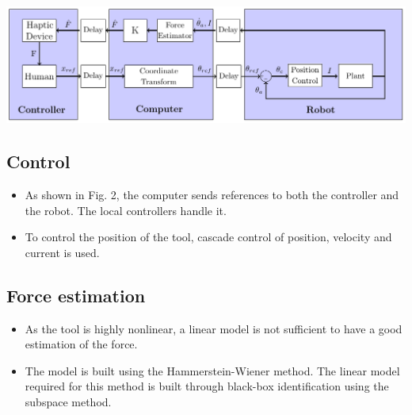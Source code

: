 \begin{center}
\includegraphics[width=\textwidth]{../Worksheets/rapport/pictures/control.pdf} 
	
	\vspace{-2mm}
	\captionsetup{font=tiny}
\end{center}




\begin{minipage}{0.45\linewidth}
\subsection*{Control}
\begin{itemize}
\item As shown in Fig. 2, the computer sends references to both the controller and the robot. The local controllers handle it.
\item To control the position of the tool, cascade control of position, velocity and current is used.
\end{itemize}
\end{minipage}
\hspace{5mm}
\begin{minipage}{0.45\linewidth}
\subsection*{Force estimation}
\begin{itemize}
	\item As the tool is highly nonlinear, a linear model is not sufficient to have a good estimation of the force.
	\item The model is built using the Hammerstein-Wiener method. The linear model required for this method is built through black-box identification using the subspace method.
\end{itemize}
\end{minipage}
